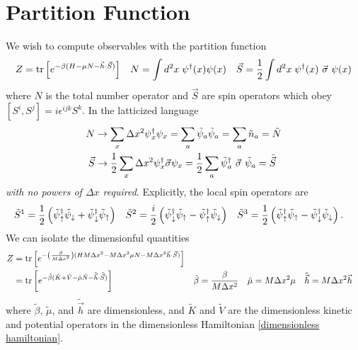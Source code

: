 \section{Partition Function}

We wish to compute observables with the partition function
\begin{align}
	Z
	&=
	\text{tr}\left[e^{-\beta(H-\mu N - \vec{h}\cdot\vec{S})}\right]
	&
	N &= \int d^2x\; \psi{}^{\dagger}(x)\psi(x)
	&
	\vec{S} = \frac{1}{2} \int d^2x\; \psi{}^{\dagger}(x) ~ \vec{\sigma} ~ \psi(x)
\end{align}
where $N$ is the total number operator and $\vec{S}$ are spin operators which obey $[S^i, S^j] = i\epsilon^{ijk} S^k$.
In the latticized language 
\begin{align}
	N
	&\rightarrow
	\sum_x \Delta x^2 \psi{}^{\dagger}_x \psi_x
	=
	\sum_a \tilde{\psi}_a \tilde{\psi}_a
	=
	\sum_a \tilde{n}_a
	=
	\tilde{N}
	\\
	\vec{S}
	&\rightarrow
	\frac{1}{2} \sum_x \Delta x^2 \psi{}^{\dagger}_x \vec{\sigma} \psi_x
	=
	\frac{1}{2} \sum_a \tilde{\psi}{}^{\dagger}_a ~ \vec{\sigma} ~ \tilde{\psi}_a
	=
	\tilde{\vec{S}}
\end{align}
\emph{with no powers of $\Delta x$ required}.
Explicitly, the local spin operators are
\begin{align}
	\tilde{S}^1 &= \frac{1}{2} \left(\tilde{\psi}{}^{\dagger}_\uparrow \tilde{\psi}_\downarrow + \tilde{\psi}{}^{\dagger}_\downarrow \tilde{\psi}_\uparrow\right)
	&
	\tilde{S}^2 &= \frac{i}{2} \left( \tilde{\psi}{}^{\dagger}_\downarrow \tilde{\psi}_\uparrow - \tilde{\psi}{}^{\dagger}_\uparrow \tilde{\psi}_\downarrow\right)
	&
	\tilde{S}^3 &= \frac{1}{2} \left(\tilde{\psi}{}^{\dagger}_\uparrow \tilde{\psi}_\uparrow - \tilde{\psi}{}^{\dagger}_\downarrow \tilde{\psi}_\downarrow\right).
\end{align}
We can isolate the dimensionful quantities
\begin{align}
	Z
	&=
	\text{tr}\left[e^{-\left(\frac{\beta}{M\Delta x^2}\right)(HM\Delta x^2 -M \Delta x^2 \mu N - M \Delta x^2 \vec{h} \cdot \vec{S})}\right]
\\
	&=
	\text{tr}\left[e^{-\tilde{\beta}(\tilde{K}+\tilde{V}-\tilde{\mu} \tilde{N} - \tilde{\vec{h}}\cdot\tilde{\vec{S}})}\right]
	&
	\tilde{\beta} &= \frac{\beta}{M \Delta x^2}
	&
	\tilde{\mu}   &= M \Delta x^2 \mu
	&
	\tilde{\vec{h}} &= M \Delta x^2 \vec{h}
\end{align}
where $\tilde{\beta}$, $\tilde{\mu}$, and $\tilde{\vec{h}}$ are dimensionless, and $\tilde{K}$ and $\tilde{V}$ are the dimensionless kinetic and potential operators in the dimensionless Hamiltonian \eqref{dimensionless hamiltonian}.

